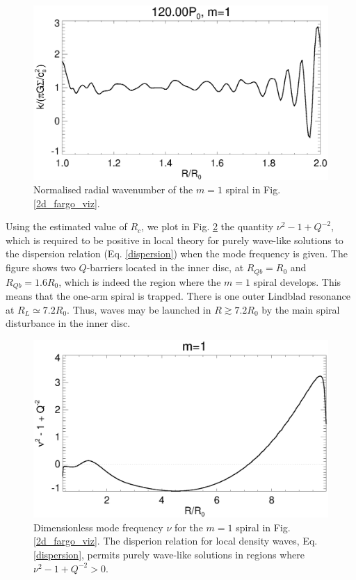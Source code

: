\begin{figure}
  \includegraphics[width=\linewidth]{figures/m1_analysis_kr120_fargo.ps}
  \caption{Normalised radial wavenumber of the $m=1$ spiral in
    Fig. \ref{2d_fargo_viz}.\label{fargo_wavenumber}} 
\end{figure}   

Using the estimated value of $R_c$, we plot in
Fig. \ref{fargo_qbarrier} the quantity $\nu^2 - 1 + Q^{-2}$, which is
required to be positive in local theory for purely wave-like
solutions to the dispersion relation (Eq. \ref{dispersion}) when the
mode frequency is given. The figure shows two $Q$-barriers located in
the inner disc, at $R_{Qb}=R_0$ and $R_{Qb}=1.6R_0$, which is indeed the
region where the $m=1$ spiral develops. This means that the one-arm
spiral is trapped. There is one outer Lindblad resonance at $R_L\simeq
7.2R_0$. Thus, waves may be launched in $R\gtrsim 7.2R_0$ by the main 
spiral disturbance in the inner disc. %

\begin{figure}
  \includegraphics[width=\linewidth]{figures/m1_analysis_Qbar_fargo.ps} 
  \caption{Dimensionless mode frequency $\nu$ for the $m=1$ spiral in
    Fig. \ref{2d_fargo_viz}. The disperion relation for local density
    waves, Eq. \ref{dispersion}, permits purely wave-like solutions in 
    regions where $\nu^2 - 1 + Q^{-2}>0$. 
    \label{fargo_qbarrier}} 
\end{figure}


